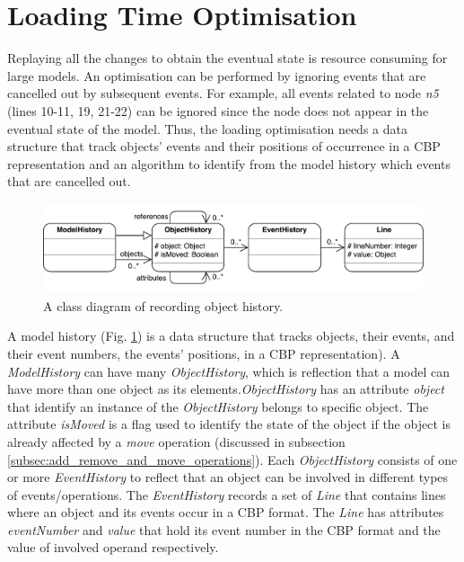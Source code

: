 \documentclass{llncs}
\begin{document}
\section{Loading Time Optimisation}
\label{sec:loading_time_optimisation}
Replaying all the changes to obtain the eventual state is resource consuming for large models. An optimisation can be performed by ignoring events that are cancelled out by subsequent events. For example, all events related to node \emph{n5} (lines 10-11, 19, 21-22) can be ignored since the node does not appear in the eventual state of the model. Thus, the loading optimisation needs a data structure that track objects' events and their positions of occurrence in a CBP representation and an algorithm to identify from the model history which events that are cancelled out.

\begin{figure}[ht]
\centering
\includegraphics[width=\linewidth]{object_history}
\caption{A class diagram of recording object history.}
\label{fig:object_history}
\end{figure}

A model history (Fig. \ref{fig:object_history}) is a data structure that tracks objects, their events, and their event numbers, the events' positions, in a CBP representation). A \emph{ModelHistory} can have many \emph{ObjectHistory}, which is reflection that a model can have more than one object as its elements.\emph{ObjectHistory} has an attribute \emph{object} that identify an instance of the \emph{ObjectHistory} belongs to specific object. The attribute \emph{isMoved} is a flag used to identify the state of the object if the object is already affected by a \emph{move} operation (discussed in subsection \ref{subsec:add_remove_and_move_operations}). Each \emph{ObjectHistory} consists of one or more \emph{EventHistory} to reflect that an object can be involved in different types of events/operations. The \emph{EventHistory} records a set of \emph{Line} that contains lines where an object and its events occur in a CBP format. The \emph{Line} has attributes \emph{eventNumber} and \emph{value} that hold its event number in the CBP format and the value of involved operand respectively. 
\end{document}
